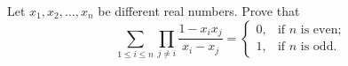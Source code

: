 Let $x_1, x_2, \ldots, x_n$ be different real numbers. Prove that
\[ \sum_{1 \leq i \leq n} \prod_{j \neq i} \frac{1 - x_i x_j}{x_i - x_j} = \begin{cases} 0, & \text{if } n \text{ is even;} \\ 1, & \text{if } n \text{ is odd.} \end{cases} \]
